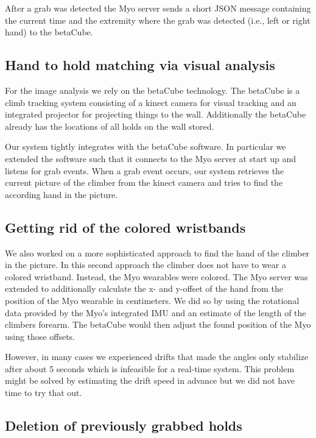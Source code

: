 After a grab was detected the Myo server sends a short JSON message containing the current time and the extremity where the grab was detected (i.e., left or right hand) to the betaCube.

\subsection{Hand to hold matching via visual analysis}
For the image analysis we rely on the betaCube technology.
The betaCube is a climb tracking system consisting of a kinect camera for visual tracking and an integrated projector for projecting things to the wall.
Additionally the betaCube already has the locations of all holds on the wall stored.

Our system tightly integrates with the betaCube software.
In particular we extended the software such that it connects to the Myo server at start up and listens for grab events.
When a grab event occurs, our system retrieves the current picture of the climber from the kinect camera and tries to find the according hand in the picture.


\subsection{Getting rid of the colored wristbands}
We also worked on a more sophisticated approach to find the hand of the climber in the picture.
In this second approach the climber does not have to wear a colored wristband.
Instead, the Myo wearables were colored.
The Myo server was extended to additionally calculate the x- and y-offset of the hand from the position of the Myo wearable in centimeters.
We did so by using the rotational data provided by the Myo's integrated IMU and an estimate of the length of the climbers forearm.
The betaCube would then adjust the found position of the Myo using those offsets.

However, in many cases we experienced drifts that made the angles only stabilize after about 5 seconds which is infeasible for a real-time system.
This problem might be solved by estimating the drift speed in advance but we did not have time to try that out.

\subsection{Deletion of previously grabbed holds}

